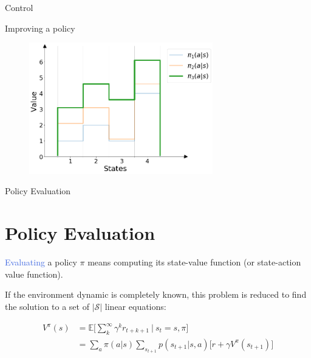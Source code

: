 \documentclass{beamer}
\begin{document}
\begin{frame}{Control}

Improving a policy

\begin{figure}[t]
\includegraphics[width=8cm]{./images/pi3.png}
\centering
\end{figure}

\end{frame}


\begin{frame}{Policy Evaluation}
\section{Policy Evaluation}

\textcolor{RoyalBlue}{Evaluating} a policy $\pi$ means computing its state-value function (or state-action value function).

\vspace{2mm}

If the environment dynamic is completely known, this problem is reduced to find the solution to a set of $\mathcal{|S|}$ linear equations:



\begin{align*}
    V^{\pi}(s)& = \mathds{E} \bigg[\sum_{k}^{\infty}\gamma^{k} r_{t+k+1} \: \bigg| \: s_t=s,\pi \bigg] \\
		   & = \sum_a \pi(a|s) \sum_{s_{t+1}} p(s_{t+1}|s,a)\big[r + \gamma V^{\pi}({s_{t+1}}) \big] 
\end{align*}

\end{frame}
\end{document}
